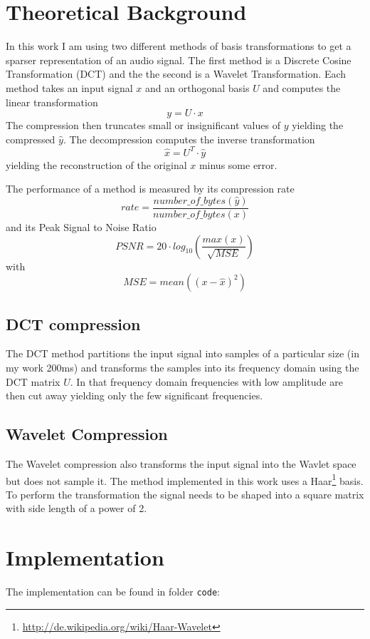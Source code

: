 \documentclass[a4paper]{scrartcl}
\begin{document}
\section{Theoretical Background} 

In this work I am using two different methods of basis transformations to get a
sparser representation of an audio signal. The first method is a Discrete Cosine
Transformation (DCT) and the the second is a Wavelet Transformation. Each method
takes an input signal $x$ and an orthogonal basis $U$ and computes the linear
transformation $$y = U \cdot x$$ The compression then truncates small or
insignificant values of $y$ yielding the compressed $\hat{y}$. The decompression
computes the inverse transformation $$\hat{x} = U^T \cdot \hat{y}$$ yielding the
reconstruction of the original $x$ minus some error.

The performance of a method is measured by its compression rate
$$ rate=\frac{number\_of\_bytes(\hat{y})}{number\_of\_bytes(x)}$$ and its Peak Signal
to Noise Ratio $$PSNR=20 \cdot log_{10}\left(\frac{max(x)}{\sqrt{MSE}}\right)$$
with $$ MSE = mean((x - \hat{x})^2)$$

\subsection{DCT compression} The DCT method partitions the input signal into
samples of a particular size (in my work 200ms) and transforms the samples into
its frequency domain using the DCT matrix $U$. In that frequency domain
frequencies with low amplitude are then cut away yielding only the few
significant frequencies.

\subsection{Wavelet Compression} The Wavelet compression also transforms the
input signal into the Wavlet space but does not sample it. The method
implemented in this work uses a
Haar\footnote{\url{http://de.wikipedia.org/wiki/Haar-Wavelet}} basis. To perform the
transformation the signal needs to be shaped into a square matrix with side
length of a power of 2.

\section{Implementation}
\label{sec:implementation}

The implementation can be found in folder \texttt{code}: 
\end{document}
